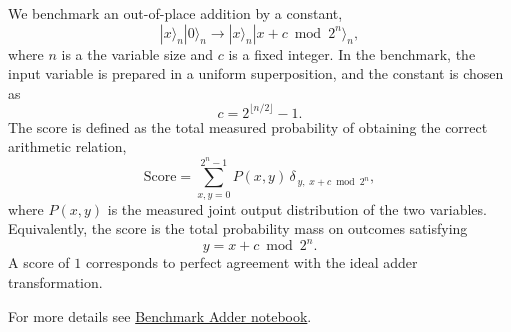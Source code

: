 We benchmark an out-of-place addition by a constant,
\[
|x\rangle_n |0\rangle_n \rightarrow |x\rangle_n |x+c \bmod{2^n}\rangle_n,
\]
where $n$ is a the variable size and \(c\) is a fixed integer. In the benchmark, the input variable is prepared in a uniform superposition, and the constant is chosen as
\[
c = 2^{\lfloor n/2 \rfloor} - 1.
\]
The score is defined as the total measured probability of obtaining the correct arithmetic relation,
\[
\mathrm{Score} =
\sum_{x,y=0}^{2^n-1} P(x,y)\,\delta_{\,y,\;x+c \bmod{2^n}},
\]
where \(P(x,y)\) is the measured joint output distribution of the two variables. Equivalently, the score is the total probability mass on outcomes satisfying
\[
y = x+c \bmod{2^n}.
\]
A score of \(1\) corresponds to perfect agreement with the ideal adder transformation.
\smallskip

For more details see \href{https://github.com/Classiq/classiq-library/tree/main/benchmarking/benchmarks/benchmark\_adder.ipynb}{Benchmark Adder notebook}.
\medskip
